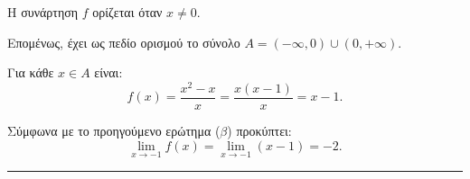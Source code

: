 \begin{alist}
\item Η συνάρτηση $f$ ορίζεται όταν $x \neq 0$.

Επομένως, έχει ως πεδίο ορισμού το σύνολο $A = (-\infty, 0) \cup (0, +\infty)$.

\item Για κάθε $x \in A$ είναι:
\[ f(x) = \frac{x^2-x}{x} = \frac{x(x-1)}{x} = x - 1. \]

\item Σύμφωνα με το προηγούμενο ερώτημα ($\beta$) προκύπτει:
\[ \lim\limits_{x \to -1} f(x) = \lim\limits_{x \to -1} (x - 1) = -2. \]
\end{alist}
\vspace{6mm}
\noindent\rule{\textwidth}{0.4pt}
\vspace{6mm}

